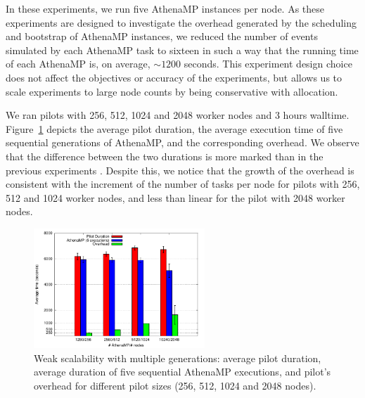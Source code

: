 
In these experiments, we run five AthenaMP instances per node.  As these
experiments are designed to investigate the overhead generated by the
scheduling and bootstrap of AthenaMP instances, we reduced the number of
events simulated by each AthenaMP task to sixteen in such a way that the
running time of each AthenaMP is, on average, $\sim 1200$ seconds. This
experiment design choice does not affect the  objectives or accuracy of the
experiments, but allows us to scale experiments to large node counts by being
conservative with allocation.


We ran
pilots
with 256, 512, 1024 and 2048 worker nodes and
3 hours walltime. Figure~\ref{fig:weakScal2a} depicts the average
pilot duration, the average execution time of five sequential
generations of AthenaMP, and the corresponding overhead. We
observe that the difference between the two durations is more marked than in the
previous experiments . Despite this, we notice that the growth of the overhead is consistent with the increment of the number of tasks per node for pilots with 256, 512 and 1024 worker nodes, and less than linear for the pilot with 2048 worker nodes.

\begin{figure}[!htb]
        \includegraphics[height=4.5cm,width=\columnwidth]{./figures/NGE/weak2.pdf}
    \caption{Weak scalability with multiple generations: average pilot
    duration, average duration of five sequential AthenaMP executions, and
    pilot's overhead for different pilot sizes (256, 512, 1024 and 2048 nodes).}
\label{fig:weakScal2a}
\end{figure}

